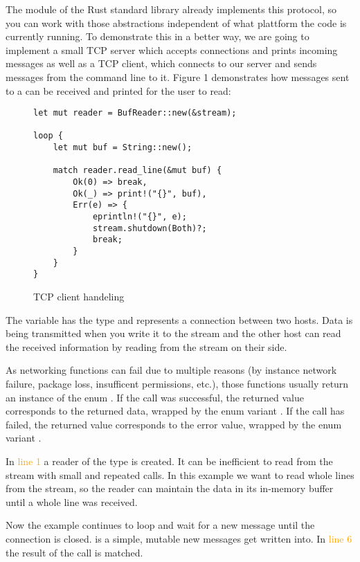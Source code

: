 The module  of the Rust standard library already implements this protocol, so you can work with those
abstractions independent of what plattform the code is currently running. To demonstrate this in a better way, we are
going to implement a small TCP server which accepts connections and prints incoming messages as well as a TCP client,
which connects to our server and sends messages from the command line to it. Figure 1 demonstrates how messages sent to
a  can be received and printed for the user to read:

\begin{figure}[h]
    \begin{verbatim}
let mut reader = BufReader::new(&stream);

loop {
    let mut buf = String::new();

    match reader.read_line(&mut buf) {
        Ok(0) => break,
        Ok(_) => print!("{}", buf),
        Err(e) => {
            eprintln!("{}", e);
            stream.shutdown(Both)?;
            break;
        }
    }
}
    \end{verbatim}
    \caption{TCP client handeling}
\end{figure}

The variable  has the type  and represents a connection between two hosts. Data is being
transmitted when you write it to the stream and the other host can read the received information by reading from the
stream on their side.

As networking functions can fail due to multiple reasons (by instance network failure, package loss, insufficent
permissions, etc.), those functions usually return an instance of the enum . If the call was
successful, the returned value corresponds to the returned data, wrapped by the enum variant . If the call
has failed, the returned value corresponds to the error value, wrapped by the enum variant .

In \textcolor{orange}{line 1} a reader of the type  is created. It can be inefficient to read
from the stream with small and repeated calls. In this example we want to read whole lines from the stream, so the
reader can maintain the data in its in-memory buffer until a whole line was received.

Now the example continues to loop and wait for a new message until the connection is closed.  is a simple,
mutable  new messages get written into. In \textcolor{orange}{line 6} the result of the call
 is matched.

